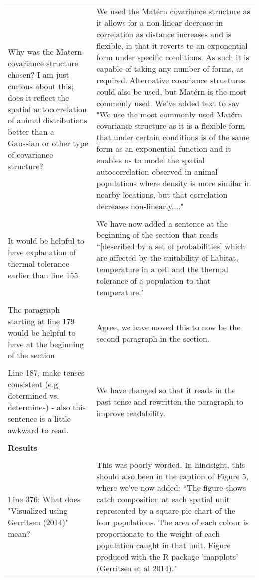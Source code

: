 \documentclass[10pt]{letter}
\begin{document}
\begin{landscape}
\begin{center}
\begin{longtable}{p{12cm} | p{12cm}}
\\
Why was the Matern covariance structure chosen? I am just curious about this;
does it reflect the spatial autocorrelation of animal distributions better than
a Gaussian or other type of covariance structure? & We used the Matérn
covariance structure as it allows for a non-linear decrease in correlation as
distance increases and is flexible, in that it reverts to an exponential form
under specific conditions. As such it is capable of taking any number of forms,
as required. Alternative covariance structures could also be used, but Matérn
is the most commonly used. We've added text to say "We use the most commonly
used Matérn covariance structure as it is a flexible form that under certain
conditions is of the same form as an exponential function and it enables us to
model the spatial autocorrelation observed in animal populations where density
is more similar in nearby locations, but that correlation decreases
non-linearly...." \\ 
\\
It would be helpful to have explanation of thermal tolerance earlier than line
155 & We have now added a sentence at the beginning of the section that reads
``[described by a set of probabilities] which are affected by the suitability of
habitat, temperature in a cell and the thermal tolerance of a population to
that temperature." \\
\\
The paragraph starting at line 179 would be helpful to have at the beginning of
the section & Agree, we have moved this to now be the second paragraph in the
section. \\
\\
Line 187, make tenses consistent (e.g. determined vs. determines) - also this
sentence is a little awkward to read. & We have changed so that it reads in the
past tense and rewritten the paragraph to improve readability. \\
\\
		\hline
		\textbf{Results} &  \\
\\
Line 376: What does "Visualized using Gerritsen (2014)" mean? & This was poorly
worded. In hindsight, this should also been in the caption of Figure 5, where
we've now added: ``The figure shows catch composition at each spatial unit
represented by a square pie chart of the four populations. The area of each
colour is proportionate to the weight of each population caught in that unit.
Figure produced with the R package 'mapplots' (Gerritsen et al 2014)." \\

\end{longtable}
\end{center}
\end{landscape}
\end{document}
